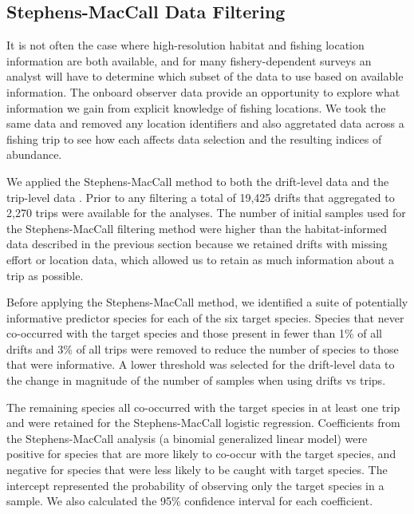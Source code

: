 \documentclass[
  authoryear,
  preprint,
  3p]{elsarticle}
\begin{document}
\hypertarget{stephens-maccall-data-filtering}{%
\subsection{Stephens-MacCall Data
Filtering}\label{stephens-maccall-data-filtering}}

It is not often the case where high-resolution habitat and fishing
location information are both available, and for many fishery-dependent
surveys an analyst will have to determine which subset of the data to
use based on available information. The onboard observer data provide an
opportunity to explore what information we gain from explicit knowledge
of fishing locations. We took the same data and removed any location
identifiers and also aggretated data across a fishing trip to see how
each affects data selection and the resulting indices of abundance.

We applied the Stephens-MacCall method to both the drift-level data and
the trip-level data \citeyearpar{Stephens:2004:MAS}. Prior to any
filtering a total of 19,425 drifts that aggregated to 2,270 trips were
available for the analyses. The number of initial samples used for the
Stephens-MacCall filtering method were higher than the habitat-informed
data described in the previous section because we retained drifts with
missing effort or location data, which allowed us to retain as much
information about a trip as possible.

Before applying the Stephens-MacCall method, we identified a suite of
potentially informative predictor species for each of the six target
species. Species that never co-occurred with the target species and
those present in fewer than 1\% of all drifts and 3\% of all trips were
removed to reduce the number of species to those that were informative.
A lower threshold was selected for the drift-level data to the change in
magnitude of the number of samples when using drifts vs trips.

The remaining species all co-occurred with the target species in at
least one trip and were retained for the Stephens-MacCall logistic
regression. Coefficients from the Stephens-MacCall analysis (a binomial
generalized linear model) were positive for species that are more likely
to co-occur with the target species, and negative for species that were
less likely to be caught with target species. The intercept represented
the probability of observing only the target species in a sample. We
also calculated the 95\% confidence interval for each coefficient.
\end{document}
